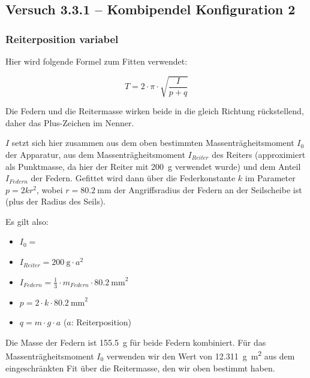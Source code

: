 \clearpage
\subsection{Versuch 3.3.1 -- Kombipendel Konfiguration 2}
\label{subsec:kombiKonfig2}


\subsubsection{Reiterposition variabel}

Hier wird folgende Formel zum Fitten verwendet:

\begin{equation}
    T = 2 \cdot \pi \cdot \sqrt{\frac{I}{p + q}}
\end{equation}

Die Federn und die Reitermasse wirken beide in die gleich Richtung r\"uckstellend,
daher das Plus-Zeichen im Nenner.

$I$ setzt sich  hier zusammen aus dem  oben bestimmten Massentr\"agheitsmoment
$I_0$ der Apparatur, aus  dem Massentr\"agheitsmoment $I_{Reiter}$ des Reiters
(approximiert  als   Punktmasse,  da  hier  der   Reiter  mit  \SI{200}{\gram}
verwendet  wurde)  und  dem  Anteil  $I_{Federn}$  der  Federn. Gefittet  wird
dann  \"uber die  Federkonstante $k$  im  Parameter $p  = 2kr^2$,  wobei $r  =
\SI{80.2}{\milli\meter}$ der Angriffsradius der  Federn an der Seilscheibe ist
(plus der Radius des Seils).

Es gilt also:
\begin{itemize}
    \item
        $I_0 = $
    \item
        $I_{Reiter} = \SI{200}{\gram} \cdot a^2$
    \item
        $I_{Federn} = \frac{1}{3} \cdot m_{Federn} \cdot \SI{80.2}{\milli\meter}^2$
    \item
        $p = 2 \cdot k \cdot \SI{80.2}{\milli\meter}^2$
    \item
        $q = m \cdot g \cdot a$ ($a$: Reiterposition)
\end{itemize}

Die   Masse   der   Federn    ist   \SI{155.5}{\gram}   f\"ur   beide   Federn
kombiniert. F\"ur das Massentr\"agheitsmoment $I_0$ verwenden wir den Wert von
\SI{12.311}{\gram\meter\squared}  aus  dem  eingeschr\"ankten Fit  \"uber  die
Reitermasse, den wir oben bestimmt haben.

